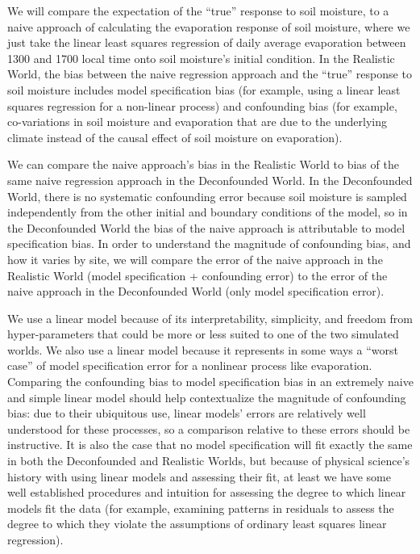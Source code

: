 \documentclass[12pt]{article}
\begin{document}
We will compare the expectation of the ``true'' response to soil
moisture, to a naive approach of calculating the evaporation response
of soil moisture, where we just take the linear least squares
regression of daily average evaporation between 1300 and 1700 local
time onto soil moisture's initial condition. In the Realistic World,
the bias between the naive regression approach and the ``true''
response to soil moisture includes model specification bias (for
example, using a linear least squares regression for a non-linear
process) and confounding bias (for example, co-variations in soil
moisture and evaporation that are due to the underlying climate
instead of the causal effect of soil moisture on evaporation).

We can compare the naive approach's bias in the Realistic World to
bias of the same naive regression approach in the Deconfounded
World. In the Deconfounded World, there is no systematic confounding
error because soil moisture is sampled independently from the other
initial and boundary conditions of the model, so in the Deconfounded
World the bias of the naive approach is attributable to model
specification bias. In order to understand the magnitude of
confounding bias, and how it varies by site, we will compare the error
of the naive approach in the Realistic World (model specification +
confounding error) to the error of the naive approach in the
Deconfounded World (only model specification error).

We use a linear model because of its interpretability, simplicity, and
freedom from hyper-parameters that could be more or less suited to one
of the two simulated worlds. We also use a linear model because it
represents in some ways a ``worst case'' of model specification error
for a nonlinear process like evaporation. Comparing the confounding
bias to model specification bias in an extremely naive and simple
linear model should help contextualize the magnitude of confounding
bias: due to their ubiquitous use, linear models' errors are
relatively well understood for these processes, so a comparison
relative to these errors should be instructive. It is also the case
that no model specification will fit exactly the same in both the
Deconfounded and Realistic Worlds, but because of physical science's
history with using linear models and assessing their
fit\cite{shalizi2013}, at least we have some well established
procedures and intuition for assessing the degree to which linear
models fit the data (for example, examining patterns in residuals to
assess the degree to which they violate the assumptions of ordinary
least squares linear regression).
\end{document}
